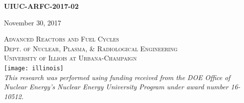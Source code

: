 \begin{titlepage}
    \vspace{1cm}
    \textsc{\LARGE\bfseries UIUC-ARFC-2017-02} %
    \vspace{0.5cm}
    
    
    \vspace{0.5cm} %
    {\large November 30, 2017} %
    \vspace{0.5cm}

    
    \textsc{\LARGE Advanced Reactors and Fuel Cycles}\\[0.25cm] %
    
    \textsc{\large Dept. of Nuclear, Plasma, \& Radiological Engineering}\\%
    
    \textsc{\large University of Illiois at Urbana-Champaign}\\ %


    
    
    \vspace{0.5cm}
    \texttt{[image: illinois]}\\[1cm] %
     

    \textit{This research was performed using funding received from the 
    DOE Office of Nuclear Energy's Nuclear Energy University Program under 
    award number 16-10512.} 

\end{titlepage}

